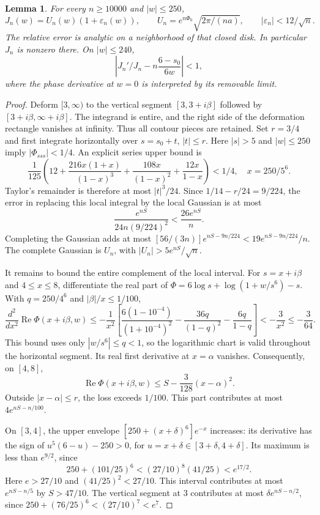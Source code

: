 \documentclass[11pt]{article}
\newtheorem{lemma}[theorem]{Lemma}
\begin{document}
\begin{lemma}\label{lem:J}
For every $n\ge10000$ and $|w|\le250$,
\[
 J_n(w)=U_n(w)(1+\varepsilon_n(w)),\qquad
 U_n=e^{n\Phi_0}\sqrt{2\pi/(na)},\qquad
 |\varepsilon_n|<12/\sqrt n.                           \tag{6}
\]
The relative error is analytic on a neighborhood of that closed disk.
In particular $J_n$ is nonzero there. On $|w|\le240$,
\[
 \left|J_n'/J_n-n\frac{6-s_0}{6w}\right|<1,             \tag{7}
\]
where the phase derivative at $w=0$ is interpreted by its removable limit.
\end{lemma}
\begin{proof}
Deform $[3,\infty)$ to the vertical segment $[3,3+i\beta]$ followed by
$[3+i\beta,\infty+i\beta]$. The integrand is entire, and the right side
of the deformation rectangle vanishes at infinity. Thus all contour
pieces are retained. Set $r=3/4$ and first integrate horizontally over
$s=s_0+t$, $|t|\le r$. Here $|s|>5$ and $|w|\le250$ imply
$|\Phi_{sss}|<1/4$. An explicit series upper bound is
\[
 \frac1{125}\left(12+
 \frac{216x(1+x)}{(1-x)^3}+\frac{108x}{(1-x)^2}
 +\frac{12x}{1-x}\right)<1/4,\quad x=250/5^6.           \tag{8}
\]
Taylor's remainder is therefore at most $|t|^3/24$.
Since $1/14-r/24=9/224$, the error in replacing this local integral
by the local Gaussian is at most
\[
 \frac{e^{nS}}{24n(9/224)^2}<\frac{26e^{nS}}n.
\]
Completing the Gaussian adds at most
$[56/(3n)]e^{nS-9n/224}<19e^{nS-9n/224}/n$.
The complete Gaussian is $U_n$, with $|U_n|>5e^{nS}/\sqrt n$.

It remains to bound the entire complement of the local interval.
For $s=x+i\beta$ and $4\le x\le8$, differentiate the real part of
$\Phi=6\log s+\log(1+w/s^6)-s$. With $q=250/4^6$ and
$|\beta|/x\le1/100$,
\[
 \frac{d^2}{dx^2}\operatorname{Re}\Phi(x+i\beta,w)
 \le-\frac1{x^2}\left[
 \frac{6(1-10^{-4})}{(1+10^{-4})^2}
 -\frac{36q}{(1-q)^2}-\frac{6q}{1-q}\right]
 <-\frac3{x^2}\le-\frac3{64}.                         \tag{9}
\]
This bound uses only $|w/s^6|\le q<1$, so the logarithmic chart is
valid throughout the horizontal segment. Its real first derivative at
$x=\alpha$ vanishes. Consequently, on $[4,8]$,
\[
 \operatorname{Re}\Phi(x+i\beta,w)
 \le S-\frac3{128}(x-\alpha)^2.
\]
Outside $|x-\alpha|\le r$, the loss exceeds $1/100$.
This part contributes at most $4e^{nS-n/100}$.

On $[3,4]$, the upper envelope
$[250+(x+\delta)^6]e^{-x}$ increases: its derivative has the sign of
$u^5(6-u)-250>0$, for $u=x+\delta\in[3+\delta,4+\delta]$.
Its maximum is less than $e^{9/2}$, since
\[
 250+(101/25)^6<(27/10)^8(41/25)<e^{17/2}.
\]
Here $e>27/10$ and $(41/25)^2<27/10$.
This interval contributes at most $e^{nS-n/5}$ by $S>47/10$.
The vertical segment at $3$ contributes at most
$\delta e^{nS-n/2}$, since
$250+(76/25)^6<(27/10)^7<e^7$.


\end{proof}
\end{document}
